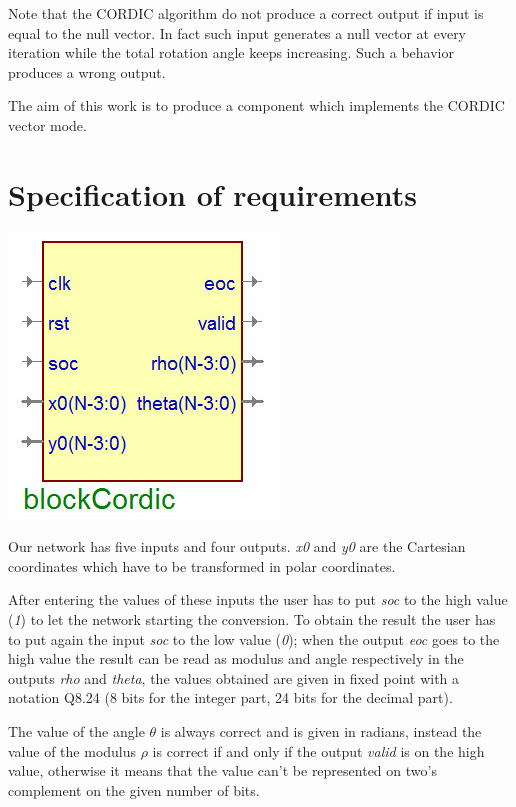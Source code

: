 \documentclass[12pt,a4paper]{report}
\begin{document}
Note that the CORDIC algorithm do not produce a correct output if input is equal to the null vector. In fact such input generates a null vector at every iteration while the total rotation angle keeps increasing. Such a behavior produces a wrong output.

The aim of this work is to produce a component which implements the CORDIC vector mode.

\section{Specification of requirements}

\begin{center}
\includegraphics[scale=.50]{img/cd.jpg}\\
\end{center}
Our network has five inputs and four outputs. \emph{x0} and \emph{y0} are the Cartesian coordinates which have to be transformed in polar coordinates. 

After entering the values of these inputs the user has to put \emph{soc} to the high value (\emph{1}) to let the network starting the conversion. To obtain the result the user has to put again the input \emph{soc} to the low value (\emph{0}); when the output \emph{eoc} goes to the high value the result can be read as modulus and angle respectively in the outputs \emph{rho} and \emph{theta}, the values obtained are given in fixed point with a notation Q8.24 (8 bits for the integer part, 24 bits for the decimal part). 

The value of the angle $\theta$ is always correct and is given in radians, instead the value of the modulus $\rho$ is correct if and  only if the output \emph{valid} is on the high value, otherwise it means that the value can't be represented on two's complement on the given number of bits. 
\end{document}
